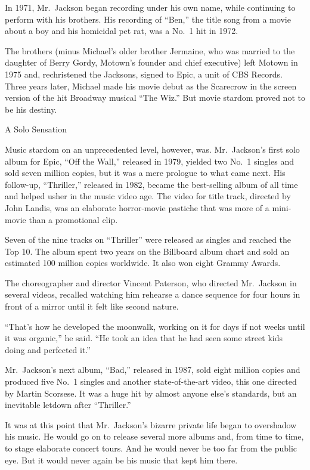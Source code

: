 ﻿\documentclass[12pt]{article}
\begin{document}
In 1971, Mr.~Jackson began recording under his own name, while continuing to perform with his
brothers. His recording of ``Ben,'' the title song from a movie about a boy and his homicidal pet
rat, was a No.~1 hit in 1972.

The brothers (minus Michael's older brother Jermaine, who was married to the daughter of Berry
Gordy, Motown's founder and chief executive) left Motown in 1975 and, rechristened the Jacksons,
signed to Epic, a unit of CBS Records. Three years later, Michael made his movie debut as the
Scarecrow in the screen version of the hit Broadway musical ``The Wiz.'' But movie stardom proved
not to be his destiny.

A Solo Sensation

Music stardom on an unprecedented level, however, was. Mr.~Jackson's first solo album for Epic,
``Off the Wall,'' released in 1979, yielded two No.~1 singles and sold seven million copies, but it
was a mere prologue to what came next. His follow-up, ``Thriller,'' released in 1982, became the
best-selling album of all time and helped usher in the music video age. The video for title track,
directed by John Landis, was an elaborate horror-movie pastiche that was more of a mini-movie than a
promotional clip.

Seven of the nine tracks on ``Thriller'' were released as singles and reached the Top 10. The album
spent two years on the Billboard album chart and sold an estimated 100 million copies worldwide. It
also won eight Grammy Awards.

The choreographer and director Vincent Paterson, who directed Mr.~Jackson in several videos,
recalled watching him rehearse a dance sequence for four hours in front of a mirror until it felt
like second nature.

``That's how he developed the moonwalk, working on it for days if not weeks until it was organic,''
he said. ``He took an idea that he had seen some street kids doing and perfected it.''

Mr.~Jackson's next album, ``Bad,'' released in 1987, sold eight million copies and produced five
No.~1 singles and another state-of-the-art video, this one directed by Martin Scorsese. It was a
huge hit by almost anyone else's standards, but an inevitable letdown after ``Thriller.''

It was at this point that Mr.~Jackson's bizarre private life began to overshadow his music. He would
go on to release several more albums and, from time to time, to stage elaborate concert tours. And
he would never be too far from the public eye. But it would never again be his music that kept him
there.
\end{document}
